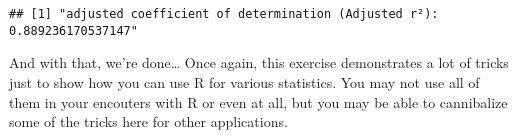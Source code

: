 \documentclass[]{article}
\begin{document}
\begin{verbatim}
## [1] "adjusted coefficient of determination (Adjusted r²): 0.889236170537147"
\end{verbatim}

And with that, we're done\ldots{} Once again, this exercise demonstrates
a lot of tricks just to show how you can use R for various statistics.
You may not use all of them in your encouters with R or even at all, but
you may be able to cannibalize some of the tricks here for other
applications.
\end{document}

